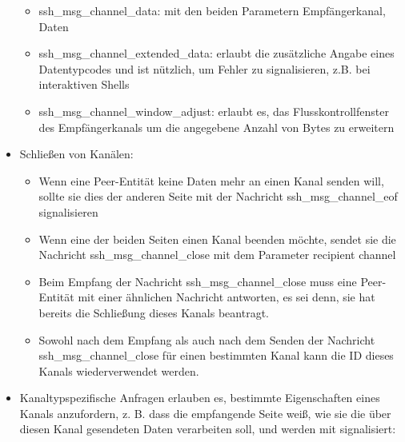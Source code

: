 \documentclass[a4paper]{article}
\begin{document}
\begin{multicols}{3}
\begin{itemize}
              \begin{itemize}
                  \item
                        ssh\_msg\_channel\_data: mit den beiden Parametern Empfängerkanal,
                        Daten
                  \item
                        ssh\_msg\_channel\_extended\_data: erlaubt die zusätzliche Angabe
                        eines Datentypcodes und ist nützlich, um Fehler zu signalisieren,
                        z.B. bei interaktiven Shells
                  \item
                        ssh\_msg\_channel\_window\_adjust: erlaubt es, das
                        Flusskontrollfenster des Empfängerkanals um die angegebene Anzahl
                        von Bytes zu erweitern
              \end{itemize}
        \item
              Schließen von Kanälen:

              \begin{itemize}
                  \item
                        Wenn eine Peer-Entität keine Daten mehr an einen Kanal senden will,
                        sollte sie dies der anderen Seite mit der Nachricht
                        ssh\_msg\_channel\_eof signalisieren
                  \item
                        Wenn eine der beiden Seiten einen Kanal beenden möchte, sendet sie
                        die Nachricht ssh\_msg\_channel\_close mit dem Parameter recipient
                        channel
                  \item
                        Beim Empfang der Nachricht ssh\_msg\_channel\_close muss eine
                        Peer-Entität mit einer ähnlichen Nachricht antworten, es sei denn,
                        sie hat bereits die Schließung dieses Kanals beantragt.
                  \item
                        Sowohl nach dem Empfang als auch nach dem Senden der Nachricht
                        ssh\_msg\_channel\_close für einen bestimmten Kanal kann die ID
                        dieses Kanals wiederverwendet werden.
              \end{itemize}
        \item
              Kanaltypspezifische Anfragen erlauben es, bestimmte Eigenschaften
              eines Kanals anzufordern, z. B. dass die empfangende Seite weiß, wie
              sie die über diesen Kanal gesendeten Daten verarbeiten soll, und
              werden mit signalisiert:


\end{itemize}
\end{multicols}
\end{document}
